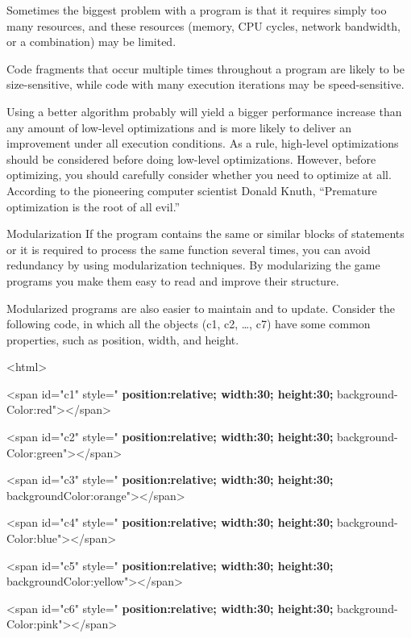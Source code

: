 \documentclass[
]{article}
\begin{document}
Sometimes the biggest problem with a program is that it requires simply
too many resources, and these resources (memory, CPU cycles, network
bandwidth, or a combination) may be limited.

Code fragments that occur multiple times throughout a program are likely
to be size-sensitive, while code with many execution iterations may be
speed-sensitive.

Using a better algorithm probably will yield a bigger performance
increase than any amount of low-level optimizations and is more likely
to deliver an improvement under all execution conditions. As a rule,
high-level optimizations should be considered before doing low-level
optimizations. However, before optimizing, you should carefully consider
whether you need to optimize at all. According to the pioneering
computer scientist Donald Knuth, ``Premature optimization is the root of
all evil.''

Modularization If the program contains the same or similar blocks of
statements or it is required to process the same function several times,
you can avoid redundancy by using modularization techniques. By
modularizing the game programs you make them easy to read and improve
their structure.

Modularized programs are also easier to maintain and to update. Consider
the following code, in which all the objects (c1, c2, \ldots, c7) have
some common properties, such as position, width, and height.

\textless html\textgreater{}

\textless span id="c1" style=" \textbf{position:relative; width:30;
height:30;}
background-Color:red"\textgreater\textless/span\textgreater{}

\textless span id="c2" style=" \textbf{position:relative; width:30;
height:30;}
background-Color:green"\textgreater\textless/span\textgreater{}

\textless span id="c3" style=" \textbf{position:relative; width:30;
height:30;}
backgroundColor:orange"\textgreater\textless/span\textgreater{}

\textless span id="c4" style=" \textbf{position:relative; width:30;
height:30;}
background-Color:blue"\textgreater\textless/span\textgreater{}

\textless span id="c5" style=" \textbf{position:relative; width:30;
height:30;}
backgroundColor:yellow"\textgreater\textless/span\textgreater{}

\textless span id="c6" style=" \textbf{position:relative; width:30;
height:30;}
background-Color:pink"\textgreater\textless/span\textgreater{}
\end{document}
